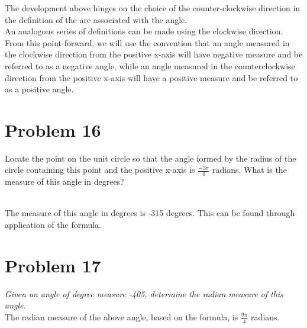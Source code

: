 \documentclass[11pt]{article} %
\newcommand\tab[1][1cm]{\hspace*{#1}}
\begin{document}
The development above hinges on the choice of the counter-clockwise direction in the definition of the arc associated with the angle. 
\\ \tab An analogous series of definitions can be made using the clockwise direction.
From this point forward, we will use the convention that an angle measured in the clockwise direction from the positive x-axis will have negative measure and be referred to as a negative angle, while an angle measured in the counterclockwise direction from the positive x-axis will have a positive measure and be referred to as a positive angle.

\section{Problem 16}
Locate the point on the unit circle so that the angle formed by the radius of the circle containing this point and the positive x-axis is $\frac{-3\pi}{4}$ radians. What is the measure of this angle in degrees? \\
\\The measure of this angle in degrees is -315 degrees. This can be found through application of the formula.

\section{Problem 17}
\textit{Given an angle of degree measure -405, determine the radian measure of this angle.} \\
\tab The radian measure of the above angle, based on the formula, is $\frac{9\pi}{4}$ radians.
\end{document}
